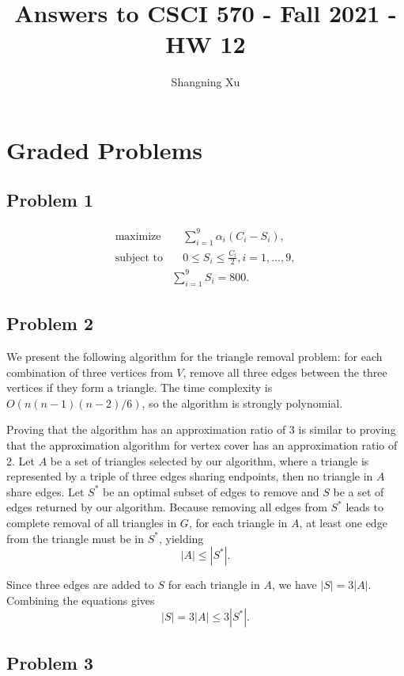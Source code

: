 \documentclass{article}
\title{Answers to CSCI 570 - Fall 2021 - HW 12}
\author{Shangning Xu}
\begin{document}
\maketitle

\section*{Graded Problems}

\subsection*{Problem 1}

\begin{align*}
    \textrm{maximize}&\quad \sum_{i = 1}^9 \alpha_i(C_i - S_i),\\
    \textrm{subject to}&\quad 0 \le S_i \le \frac{C_i}{2}, i = 1, \dots, 9,\\
    &\sum_{i = 1}^9 S_i = 800.
\end{align*}

\subsection*{Problem 2}

We present the following algorithm for the triangle removal problem: for each combination of three vertices from $V$, remove all three edges between the three vertices if they form a triangle. The time complexity is $O(n(n - 1)(n - 2)/6)$, so the algorithm is strongly polynomial.

Proving that the algorithm has an approximation ratio of 3 is similar to proving that the approximation algorithm for vertex cover has an approximation ratio of 2. Let $A$ be a set of triangles selected by our algorithm, where a triangle is represented by a triple of three edges sharing endpoints, then no triangle in $A$ share edges. Let $S^*$ be an optimal subset of edges to remove and $S$ be a set of edges returned by our algorithm. Because removing all edges from $S^*$ leads to complete removal of all triangles in $G$, for each triangle in $A$, at least one edge from the triangle must be in $S^*$, yielding
\[
    |A| \le |S^*|.
\]

Since three edges are added to $S$ for each triangle in $A$, we have $|S| = 3|A|$. Combining the equations gives
\[
    |S| = 3|A| \le 3|S^*|.
\]

\subsection*{Problem 3}
\end{document}

